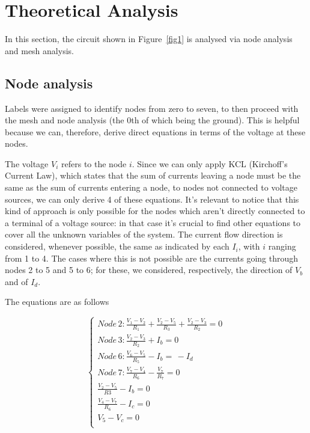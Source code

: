 \section{Theoretical Analysis}
\label{sec:analysis}

In this section, the circuit shown in Figure~\ref{fig1} is analysed via node analysis and mesh analysis.

\subsection{Node analysis}



Labels were assigned to identify nodes from zero to seven, to then proceed with the mesh and node analysis (the 0th of which being the ground). This is helpful because we can, therefore, derive direct equations in terms of the voltage at these nodes.

The voltage $V_i$ refers to the node $i$. Since we can only apply KCL (Kirchoff's Current Law), which states that the sum of currents leaving a node must be the same as the sum of currents entering a node, to nodes not connected to voltage sources, we can only derive 4 of these equations. It's relevant to notice that this kind of approach is only possible for the nodes which aren't directly connected to a terminal of a voltage source: in that case it's crucial to find other equations to cover all the unknown variables of the system.
The current flow direction is considered, whenever possible, the same as indicated by each $I_i$, with $i$ ranging from 1 to 4. The cases where this is not possible are the currents going through nodes 2 to 5 and 5 to 6; for these, we considered, respectively, the direction of $V_b$ and of $I_d$.

The equations are as follows

\begin{equation} 
\begin{cases}  
    Node\, 2: \frac{V_1 - V_2}{R_1} + \frac{V_2 - V_5}{R_3} + \frac{V_2 - V_3}{R_2} = 0 \\
    Node\, 3: \frac{V_2 - V_3}{R_2} + I_b = 0 \\
    Node\, 6: \frac{V_6 - V_5}{R_5} - I_b = \,  - I_d \\
    Node\, 7: \frac{V_7 - V_4}{R_6} - \frac{V_7}{R_7} = 0 \\
    \frac{V_2 - V_5}{R3} - I_b = 0 \\
    \frac{V_4 - V_7}{R_6} - I_c = 0\\
    V_5 - V_c = 0\\
\end{cases}
\label{eq:1}
\end{equation}


